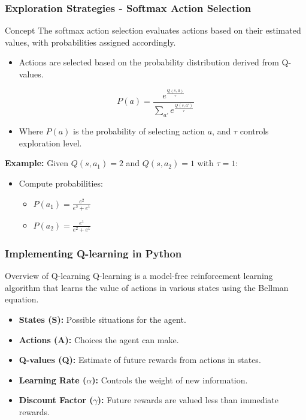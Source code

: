 \documentclass[aspectratio=169]{beamer}
\begin{document}
\begin{frame}[fragile]
    \frametitle{Exploration Strategies - Softmax Action Selection}
    \begin{block}{Concept}
        The softmax action selection evaluates actions based on their estimated values, with probabilities assigned accordingly.
    \end{block}
    
    \begin{itemize}
        \item Actions are selected based on the probability distribution derived from Q-values.
    \end{itemize}

    \begin{equation}
    P(a) = \frac{e^{\frac{Q(s, a)}{\tau}}}{\sum_{a'} e^{\frac{Q(s, a')}{\tau}}}
    \end{equation}
    \begin{itemize}
        \item Where $P(a)$ is the probability of selecting action $a$, and $\tau$ controls exploration level.
    \end{itemize}

    \textbf{Example:} Given $Q(s, a_1) = 2$ and $Q(s, a_2) = 1$ with $\tau = 1$:
    \begin{itemize}
        \item Compute probabilities: 
        \begin{itemize}
            \item $P(a_1) = \frac{e^{2}}{e^{2} + e^{1}}$
            \item $P(a_2) = \frac{e^{1}}{e^{2} + e^{1}}$
        \end{itemize}
    \end{itemize}
\end{frame}

\begin{frame}
    \frametitle{Implementing Q-learning in Python}
    \begin{block}{Overview of Q-learning}
        Q-learning is a model-free reinforcement learning algorithm that learns the value of actions in various states using the Bellman equation.
    \end{block}
    \begin{itemize}
        \item \textbf{States (S):} Possible situations for the agent.
        \item \textbf{Actions (A):} Choices the agent can make.
        \item \textbf{Q-values (Q):} Estimate of future rewards from actions in states.
        \item \textbf{Learning Rate ($\alpha$):} Controls the weight of new information.
        \item \textbf{Discount Factor ($\gamma$):} Future rewards are valued less than immediate rewards.
    \end{itemize}
\end{frame}
\end{document}
